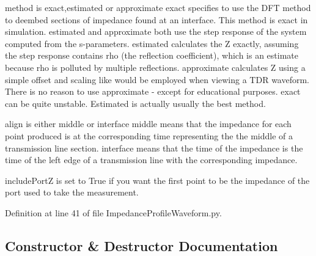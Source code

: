 method is \textquotesingle{}exact\textquotesingle{},\textquotesingle{}estimated\textquotesingle{} or \textquotesingle{}approximate\textquotesingle{} \textquotesingle{}exact\textquotesingle{} specifies to use the D\+FT method to deembed sections of impedance found at an interface. This method is exact in simulation. \textquotesingle{}estimated\textquotesingle{} and \textquotesingle{}approximate\textquotesingle{} both use the step response of the system computed from the s-\/parameters. \textquotesingle{}estimated\textquotesingle{} calculates the Z exactly, assuming the step response contains rho (the reflection coefficient), which is an estimate because rho is polluted by multiple reflections. \textquotesingle{}approximate\textquotesingle{} calculates Z using a simple offset and scaling like would be employed when viewing a T\+DR waveform. There is no reason to use \textquotesingle{}approximate\textquotesingle{} -\/ except for educational purposes. \textquotesingle{}exact\textquotesingle{} can be quite unstable. \textquotesingle{}Estimated\textquotesingle{} is actually usually the best method.

align is either \textquotesingle{}middle\textquotesingle{} or \textquotesingle{}interface\textquotesingle{} \textquotesingle{}middle\textquotesingle{} means that the impedance for each point produced is at the corresponding time representing the the middle of a transmission line section. \textquotesingle{}interface\textquotesingle{} means that the time of the impedance is the time of the left edge of a transmission line with the corresponding impedance.

include\+PortZ is set to True if you want the first point to be the impedance of the port used to take the measurement. 

Definition at line 41 of file Impedance\+Profile\+Waveform.\+py.



\subsection{Constructor \& Destructor Documentation}
\mbox{\label{classSignalIntegrity_1_1ImpedanceProfile_1_1ImpedanceProfileWaveform_1_1ImpedanceProfileWaveform_a44c18ce4afb30f11f4cdb07bc0f0c6be}} 
